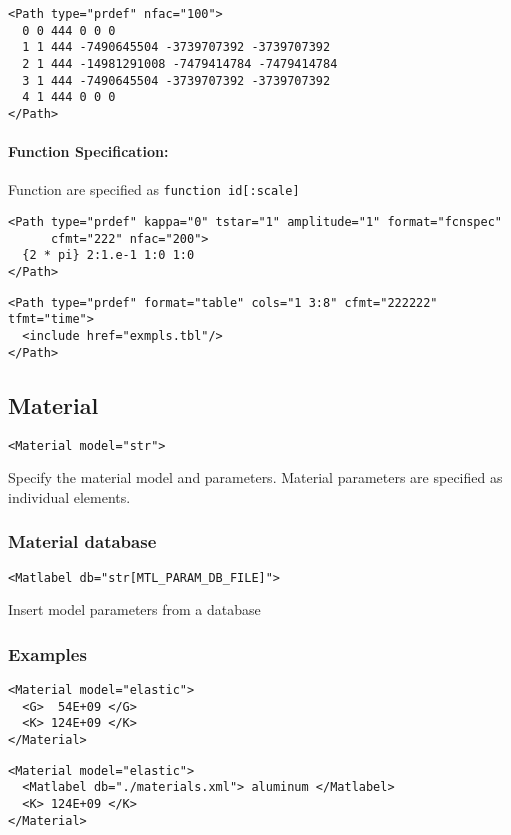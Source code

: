 \documentclass[11pt]{report}
\begin{document}
\begin{verbatim}
<Path type="prdef" nfac="100">
  0 0 444 0 0 0
  1 1 444 -7490645504 -3739707392 -3739707392
  2 1 444 -14981291008 -7479414784 -7479414784
  3 1 444 -7490645504 -3739707392 -3739707392
  4 1 444 0 0 0
</Path>
\end{verbatim}

\paragraph{Function Specification:}
Function are specified as \texttt{function id[:scale]}
\begin{verbatim}
<Path type="prdef" kappa="0" tstar="1" amplitude="1" format="fcnspec"
      cfmt="222" nfac="200">
  {2 * pi} 2:1.e-1 1:0 1:0
</Path>
\end{verbatim}

\begin{verbatim}
<Path type="prdef" format="table" cols="1 3:8" cfmt="222222" tfmt="time">
  <include href="exmpls.tbl"/>
</Path>
\end{verbatim}

\subsection{Material}
\begin{verbatim}
<Material model="str">
\end{verbatim}
%
Specify the material model and parameters. Material parameters are specified
as individual elements.

\subsubsection{Material database}
\begin{verbatim}
<Matlabel db="str[MTL_PARAM_DB_FILE]">
\end{verbatim}
%
Insert model parameters from a database

\subsubsection{Examples}
\begin{verbatim}
<Material model="elastic">
  <G>  54E+09 </G>
  <K> 124E+09 </K>
</Material>
\end{verbatim}

\begin{verbatim}
<Material model="elastic">
  <Matlabel db="./materials.xml"> aluminum </Matlabel>
  <K> 124E+09 </K>
</Material>
\end{verbatim}
\end{document}
